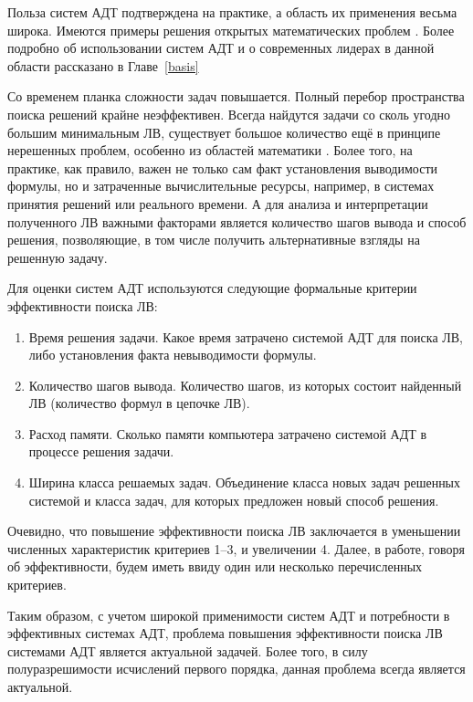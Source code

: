 \documentclass[a4paper]{report}
\begin{document}
Польза систем АДТ подтверждена на практике, а область их применения весьма широка. Имеются примеры решения открытых математических проблем \cite{McCuneRob}. Более подробно об использовании систем АДТ и о современных лидерах в данной области рассказано в Главе~\ref{basis}

Со временем планка сложности задач повышается. Полный перебор пространства поиска решений крайне неэффективен. Всегда найдутся задачи со сколь угодно большим минимальным ЛВ, существует большое количество ещё в принципе нерешенных проблем, особенно из областей математики \cite{tptp}. Более того, на практике, как правило, важен не только сам факт установления выводимости формулы, но и затраченные вычислительные ресурсы, например, в системах принятия решений или реального времени. А для анализа и интерпретации полученного ЛВ важными факторами является количество шагов вывода и способ решения, позволяющие, в том числе получить альтернативные взгляды на решенную задачу.

Для оценки систем АДТ используются следующие формальные критерии эффективности поиска ЛВ:
\label{pg:criterion}
\begin{enumerate}
\item{Время решения задачи.} Какое время затрачено системой АДТ для поиска ЛВ, либо установления факта невыводимости формулы.
\item{Количество шагов вывода.} Количество шагов, из которых состоит найденный ЛВ (количество формул в цепочке ЛВ).
\item{Расход памяти.} Сколько памяти компьютера затрачено системой АДТ в процессе решения задачи.
\item{Ширина класса решаемых задач.} Объединение класса новых задач решенных системой и класса задач, для которых предложен новый способ решения.
\end{enumerate}

Очевидно, что повышение эффективности поиска ЛВ заключается в уменьшении численных характеристик критериев 1--3, и увеличении 4. Далее, в работе, говоря об эффективности, будем иметь ввиду один или несколько перечисленных критериев. 

Таким образом, с учетом широкой применимости систем АДТ и потребности в эффективных системах АДТ, проблема повышения эффективности поиска ЛВ системами АДТ является актуальной задачей. Более того, в силу полуразрешимости исчислений первого порядка, данная проблема всегда является актуальной.
\end{document}
